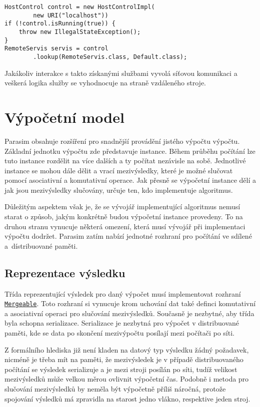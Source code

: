 \begin{lstlisting}[label={code:host:control}, caption={Přístup ke vzdálenému serveru}]
HostControl control = new HostControlImpl(
		new URI("localhost"))
if (!control.isRunning(true)) {
	throw new IllegalStateException();
}
RemoteServis servis = control
		.lookup(RemoteServis.class, Default.class);
\end{lstlisting}

Jakákoliv interakce s takto získanými službami vyvolá síťovou komunikaci a veškerá logika
služby se vyhodnocuje na straně vzdáleného stroje.

\section{Výpočetní model}

Parasim obsahuje rozšíření pro snadnější provádění jistého výpočtu vý\-poč\-tu.
Základní jednotku výpočtu zde představuje instance. Během průběhu po\-čí\-tá\-ní lze
tuto instance rozdělit na více dalších a ty počítat nezávisle na sobě. Jednotlivé instance
se mohou dále dělit a vrací mezivýsledky, které je možné slučovat pomocí asociativní
a komutativní operace. Jak přesně se výpočetní instance dělí a jak jsou mezivýsledky
slučovány, určuje ten, kdo implementuje algoritmus.

Důležitým aspektem však je, že se vývojář implementující algoritmus nemusí starat
o způsob, jakým konkrétně budou výpočetní instance provedeny. To na druhou stranu vynucuje
některá omezení, která musí vývojář při implementaci výpočtu dodržet.  Parasim zatím nabízí
jednotné rozhraní pro počítání ve sdílené a~dís\-tri\-buo\-va\-né paměti.

\subsection{Reprezentace výsledku}

Třída reprezentující výsledek pro daný výpočet musí implementovat rozhraní \href{https://github.com/sybila/parasim/blob/master/model/core/src/main/java/org/sybila/parasim/model/Mergeable.java}{\texttt{Mergeable}}. Toto rozhraní si vynucuje krom uchování dat také definci komutativní
a asociativní operaci pro slučování mezivýsledků. Sou\-čas\-ně je nezbytné, aby třída
byla schopna serializace. Serializace je nezbytná pro výpočet v dis\-tri\-buo\-va\-né paměti,
kde se data po skončení mezivýpočtu po\-sí\-la\-jí mezi počítači po síti.

Z formálního hlediska již není kladen na datový typ výsledku žádný požadavek, nicméně
je třeba mít na paměti, že mezivýsledek je v případě distribuovaného počítání se výsledek
serializuje a je mezi stroji posílán po síti, tudíž velikost mezivýsledků může velkou měrou
ovlivnit výpočetní čas. Podobně i metoda pro slučování mezivýsledků by neměla být vý\-po\-čet\-ně
příliš náročná, protože spojování výsledků má zpravidla na starost jedno vlákno, respektive
jeden stroj.

